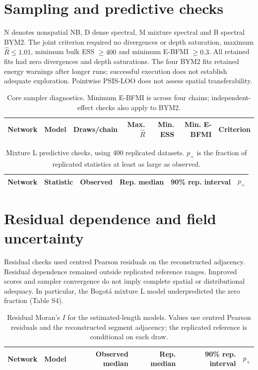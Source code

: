 \documentclass[11pt]{article}
\begin{document}
\section{Sampling and predictive checks}
N denotes nonspatial NB, D dense spectral, M mixture spectral and B spectral BYM2. The joint criterion required no divergences or depth saturation, maximum $\widehat R\leq1.01$, minimum bulk ESS $\geq400$ and minimum E-BFMI $\geq0.3$. All retained fits had zero divergences and depth saturations. The four BYM2 fits retained energy warnings after longer runs; successful execution does not establish adequate exploration. Pointwise PSIS-LOO does not assess spatial transferability.
\par
\begin{table}[!htbp]\centering\small
\caption{Core sampler diagnostics. Minimum E-BFMI is across four chains; independent-effect checks also apply to BYM2.}
\begin{tabular}{llrrrrl}\toprule Network & Model & Draws/chain & Max. $\widehat R$ & Min. ESS & Min. E-BFMI & Criterion\\\midrule
\end{tabular}\end{table}
\FloatBarrier
\par

\par
\begin{table}[!htbp]\centering\small
\caption{Mixture L predictive checks, using 400 replicated datasets. $p_+$ is the fraction of replicated statistics at least as large as observed.}
\begin{tabular}{llrrrl}\toprule Network & Statistic & Observed & Rep. median & 90\% rep. interval & $p_+$\\\midrule
\end{tabular}\end{table}
\FloatBarrier
\par
\clearpage
\section{Residual dependence and field uncertainty}
Residual checks used centred Pearson residuals on the reconstructed adjacency. Residual dependence remained outside replicated reference ranges. Improved scores and sampler convergence do not imply complete spatial or distributional adequacy. In particular, the Bogot\'a mixture L model underpredicted the zero fraction (Table S4).
\par
\begin{table}[!htbp]\centering\small
\caption{Residual Moran's $I$ for the estimated-length models. Values use centred Pearson residuals and the reconstructed segment adjacency; the replicated reference is conditional on each draw.}
\begin{tabular}{llrrrl}\toprule Network & Model & Observed median & Rep. median & 90\% rep. interval & $p_+$\\\midrule
\end{tabular}\end{table}
\FloatBarrier
\par
\end{document}
